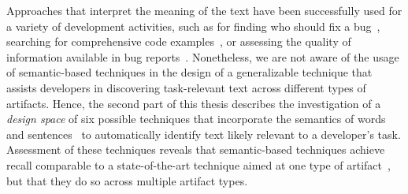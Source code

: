 









Approaches that interpret the meaning of the text have been successfully used for a variety of development activities,
such as for finding who should fix a bug~\cite{yang2016}, searching for comprehensive code examples~\cite{silva2019}, or assessing the quality of information available in bug reports~\cite{chaparro2019}.
Nonetheless, we are not aware of the usage of semantic-based techniques in the design of a generalizable technique that assists developers in discovering task-relevant text across different types of artifacts.
Hence, the second part of this thesis describes 
the investigation of a \textit{design space}
of six possible techniques that incorporate the semantics of words~\cite{Mikolov2013, Devlin2018Bert}
and sentences~\cite{fillmore1976frame, marques2021}
to automatically identify text likely relevant to a developer's task.
Assessment of these techniques reveals that semantic-based techniques
achieve recall comparable to a state-of-the-art technique aimed at one type of artifact~\cite{Xu2017}, but 
that they do so across
multiple artifact types.








